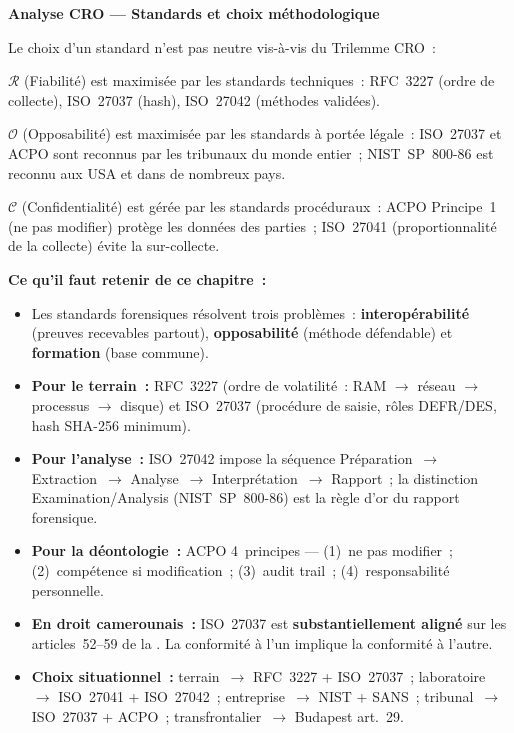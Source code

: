 \begin{boxCRO}
\textbf{Analyse CRO --- Standards et choix méthodologique}

Le choix d'un standard n'est pas neutre vis-à-vis du Trilemme CRO~:

$\mathcal{R}$ (Fiabilité) est maximisée par les standards techniques~:
RFC~3227 (ordre de collecte), ISO~27037 (hash), ISO~27042 (méthodes validées).

$\mathcal{O}$ (Opposabilité) est maximisée par les standards à portée légale~:
ISO~27037 et ACPO sont reconnus par les tribunaux du monde entier~;
NIST~SP~800-86 est reconnu aux USA et dans de nombreux pays.

$\mathcal{C}$ (Confidentialité) est gérée par les standards procéduraux~:
ACPO Principe~1 (ne pas modifier) protège les données des parties~;
ISO~27041 (proportionnalité de la collecte) évite la sur-collecte.

\end{boxCRO}

\separateur

\begin{boxresume}
\textbf{Ce qu'il faut retenir de ce chapitre~:}
\begin{itemize}
    \item Les standards forensiques résolvent trois problèmes~:
          \textbf{interopérabilité} (preuves recevables partout),
          \textbf{opposabilité} (méthode défendable) et \textbf{formation}
          (base commune).

    \item \textbf{Pour le terrain~:} RFC~3227 (ordre de volatilité~:
          RAM $\to$ réseau $\to$ processus $\to$ disque) et ISO~27037
          (procédure de saisie, rôles DEFR/DES, hash SHA-256 minimum).

    \item \textbf{Pour l'analyse~:} ISO~27042 impose la séquence
          Préparation~$\to$ Extraction~$\to$ Analyse~$\to$ Interprétation~$\to$
          Rapport~; la distinction Examination/Analysis (NIST~SP~800-86)
          est la règle d'or du rapport forensique.

    \item \textbf{Pour la déontologie~:} ACPO 4~principes --- (1)~ne
          pas modifier~; (2)~compétence si modification~; (3)~audit trail~;
          (4)~responsabilité personnelle.

    \item \textbf{En droit camerounais~:} ISO~27037 est
          \textbf{substantiellement aligné} sur les articles~52--59 de la
          . La conformité à l'un implique la conformité
          à l'autre.

    \item \textbf{Choix situationnel~:} terrain~$\to$ RFC~3227 + ISO~27037~;
          laboratoire~$\to$ ISO~27041 + ISO~27042~; entreprise~$\to$ NIST + SANS~;
          tribunal~$\to$ ISO~27037 + ACPO~; transfrontalier~$\to$ Budapest art.~29.
\end{itemize}
\end{boxresume}

